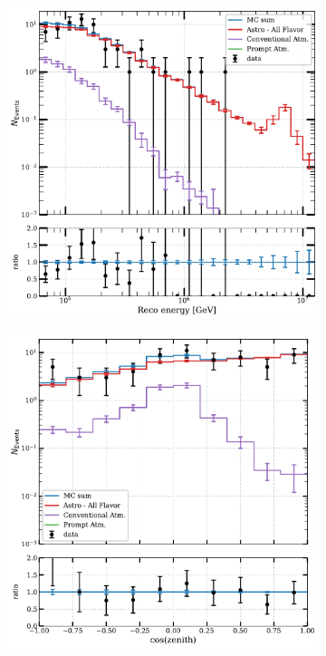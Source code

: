 \begin{figure}[h]
    \begin{subfigure}[h]{0.7\textwidth}
        \includegraphics{./figures/results/DataMC_IC86_pass2_SnowStorm_v2_Bfr_Cascades_energy.pdf}
    \end{subfigure}
    \hfill
    \begin{subfigure}[h]{0.7\textwidth}
        \includegraphics{./figures/results/DataMC_IC86_pass2_SnowStorm_v2_Bfr_Cascades_zenith.pdf}
       

\end{subfigure}
\end{figure}
